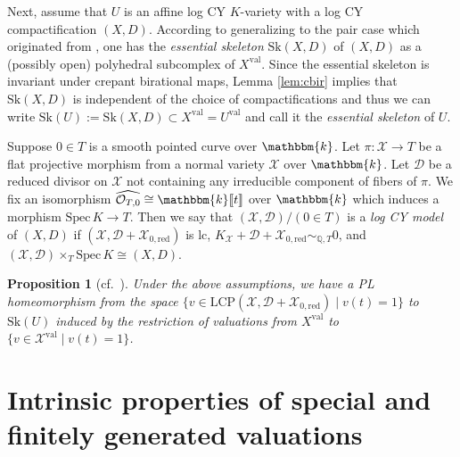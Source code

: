 \documentclass[reqno, 12pt]{amsart}
\newtheorem{prop}{Proposition}[section]
\theoremstyle{definition}
\newtheorem{defn}[prop]{Definition}
\newcommand{\bQ}{\mathbb{Q}}
\newcommand{\bk}{\mathbbm{k}}
\newcommand{\cO}{\mathcal{O}}
\newcommand{\Spec}{\mathrm{Spec}}
\newcommand{\Sk}{\mathrm{Sk}}
\newcommand{\val}{\mathrm{val}}
\newcommand{\LCP}{\mathrm{LCP}}
\newcommand{\red}{\mathrm{red}}
\newcommand{\sX}{\mathscr{X}}
\newcommand{\sD}{\mathscr{D}}
\numberwithin{equation}{section}
\begin{document}
Next, assume that $U$ is an affine log CY $K$-variety with a log CY compactification $(X,D)$. According to \cite{BM19} generalizing \cite{MN15, NX16} to the pair case which originated from \cite{KS06}, one has the \emph{essential skeleton} $\Sk(X,D)$ of $(X,D)$ as a (possibly open) polyhedral subcomplex of $X^{\val}$. Since the essential skeleton is invariant under crepant birational maps,  Lemma \ref{lem:cbir} implies that $\Sk(X,D)$ is independent of the choice of compactifications and thus we can write $\Sk(U):=\Sk(X,D) \subset X^{\val} = U^{\val}$ and call it the \emph{essential skeleton} of $U$.

Suppose $0\in T$ is a smooth pointed curve over $\bk$. Let $\pi:\sX\to T$ be a  flat projective morphism from a normal variety $\sX$ over $\bk$. Let $\sD$ be a reduced divisor on $\sX$ not containing any irreducible component of fibers of $\pi$. We fix an isomorphism $\widehat{\cO_{T,0}} \cong \bk\llbracket t\rrbracket$ over $\bk$ which induces a morphism $\Spec\,K \to T$. Then we say that $(\sX,\sD)/(0\in T)$ is a \emph{log CY model} of $(X,D)$ if $(\sX, \sD + \sX_{0,\red})$ is lc, $K_{\sX}+\sD+\sX_{0, \red} \sim_{\bQ, T} 0$, and $(\sX,\sD)\times_T \Spec\, K \cong (X,D)$. 

\begin{prop}[{cf.\ \cite[Proposition 5.1.7]{BM19}}]\label{prop:Sk-LCP}
Under the above assumptions, we have a PL homeomorphism from the space
$ \{v\in \LCP(\sX, \sD+ \sX_{0,\red})\mid v(t) = 1\}$ to $\Sk(U)$ induced by the restriction of valuations from $X^{\val}$ to $\{v\in \sX^{\val}\mid v(t)= 1\}$. 
\end{prop}









\section{Intrinsic properties of special and finitely generated valuations}\label{sec:intrinsic}
\end{document}
